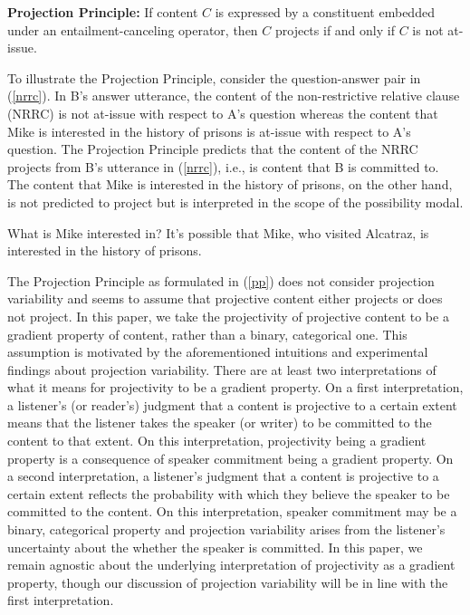 \documentclass[11pt,fleqn]{article}
\newcommand{\6}{\mbox{$[\hspace*{-.6mm}[$}}
\newcommand{\9}{\mbox{$]\hspace*{-.6mm}]$}}
\def\infelic{{\leavevmode\llap{\#}}}
\begin{document}
\begin{exe}
\ex\label{pp} {\bf Projection Principle:} If content $C$ is expressed by a constituent embedded under an entailment-canceling operator, then $C$ projects if and only if $C$ is not at-issue.

\end{exe} 
To illustrate the Projection Principle, consider the question-answer pair in (\ref{nrrc}). In B's answer utterance, the content of the non-restrictive relative clause (NRRC) is not at-issue with respect to A's question whereas the content that Mike is interested in the history of prisons is at-issue with respect to A's question. The Projection Principle predicts that the content of the NRRC projects from B's utterance in (\ref{nrrc}), i.e., is content that B is committed to. The content that Mike is interested in the history of prisons, on the other hand, is not predicted to project but  is interpreted in the scope of the possibility modal.

\begin{exe}
\ex\label{nrrc}
\begin{xlist}
 What is Mike interested in?
 It's possible that Mike, who visited Alcatraz, is interested in the history of prisons.
\end{xlist}


\end{exe}
The Projection Principle as formulated in (\ref{pp}) does not consider projection variability and seems to assume that projective content either projects or does not project. In this paper, we take the projectivity of projective content to be a gradient property of content, rather than a binary, categorical one. This assumption is motivated by the aforementioned intuitions and experimental findings about projection variability. There are at least two interpretations of what it means for projectivity to be a gradient property. On a first interpretation, a listener's (or reader's) judgment that a content is projective to a certain extent means that the listener takes the speaker (or writer) to be committed to the content to that extent. On this interpretation, projectivity being a gradient property is a consequence of speaker commitment being a gradient property. On a second interpretation, a listener's judgment that a content is projective to a certain extent reflects the probability with which they believe the speaker to be committed to the content. On this interpretation, speaker commitment may be a binary, categorical property and projection variability arises from the listener's uncertainty about the whether the speaker is committed. In this paper, we remain agnostic about the underlying interpretation of projectivity as a gradient property, though our discussion of projection variability will be in line with the first interpretation.
\end{document}
